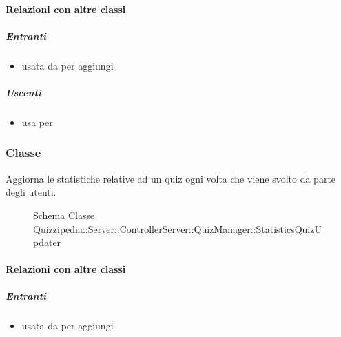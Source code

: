 \paragraph{Relazioni con altre classi}
\subparagraph{Entranti}
\begin{itemize}
\item usata da  per aggiungi
\end{itemize}
\subparagraph{Uscenti}
\begin{itemize}
\item usa  per 
\end{itemize}
\subsubsection{Classe }
Aggiorna le statistiche relative ad un quiz ogni volta che viene svolto da parte degli utenti.
\begin{figure}[H]
\centering
\noindent{}
\caption[Schema Classe StatisticsQuizUpdater]{Schema Classe Quizzipedia::Server::ControllerServer::QuizManager::StatisticsQuizUpdater}
\end{figure}
\paragraph{Relazioni con altre classi}
\subparagraph{Entranti}
\begin{itemize}
\item usata da  per aggiungi
\end{itemize}
